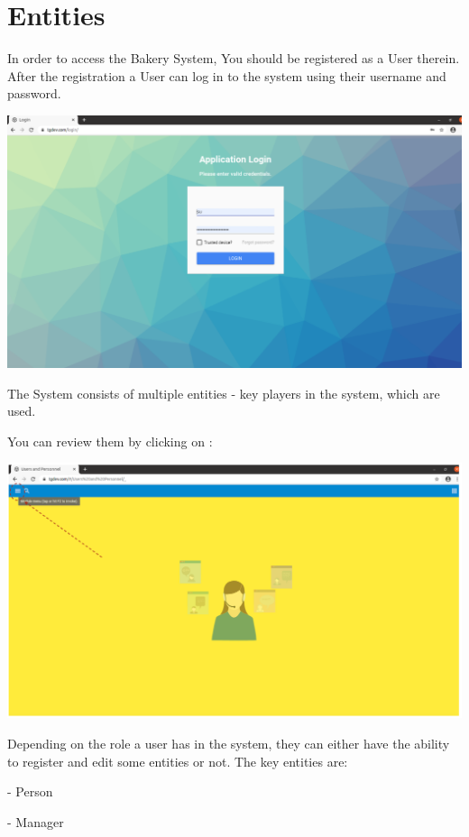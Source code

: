 \section{Entities}\label{sec:01}
In order to access the Bakery System, You should be registered as a User therein. 
After the registration a User can log in to the system using their username and password.

\includegraphics[width=\textwidth]{sections/01-chapter/images/login.png}

The System consists of multiple entities - key players in the system, which are used.

You can review them by clicking on :

\includegraphics[width=\textwidth]{sections/01-chapter/images/review1.png}

Depending on the role a user has in the system, they can either have the ability to register and edit some entities or not. 
The key entities are:

- Person 

- Manager

